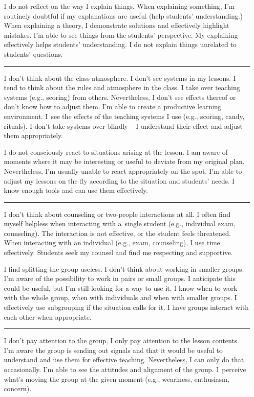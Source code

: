 \newpage
{}
{I do not reflect on the way I explain things.}
{When explaining something, I'm routinely doubtful if my explanations are useful (help students' understanding.)}
{When explaining a theory, I demonstrate solutions and effectively highlight mistakes. I'm able to see things from the students' perspective. My explaining effectively helps students' understanding. I do not explain things unrelated to students' questions.}

\rule{\textwidth}{0.4pt}
{I don't think about the class atmosphere. I don't see systems in my lessons.}
{I tend to think about the rules and atmosphere in the class. I take over teaching systems (e.g., scoring) from others. Nevertheless, I don't see effects thereof or don't know how to adjust them.}
{I'm able to create a productive learning environment. I~see the effects of the teaching systems I use (e.g., scoring, candy, rituals). I don't take systems over blindly -- I understand their effect and adjust them appropriately.}

\newpage
{}
{I do not consciously react to situations arising at the lesson.}
{I am aware of moments where it may be interesting or useful to deviate from my original plan. Nevertheless, I'm usually unable to react appropriately on the spot.}
{I'm able to adjust my lessons on the fly according to the situation and students' needs. I know enough tools and can use them effectively.}

\rule{\textwidth}{0.4pt}
{I don't think about counseling or two-people interactions at all.}
{I often find myself helpless when interacting with a~single student (e.g., individual exam, counseling). The interaction is not effective, or the student feels threatened.}
{When interacting with an individual (e.g., exam, counseling), I use time effectively. Students seek my counsel and find me respecting and supportive.}

\newpage
{}
{I find splitting the group useless. I don't think about working in smaller groups.}
{I'm aware of the possibility to work in pairs or small groups. I anticipate this could be useful, but I'm still looking for a way to use it.}
{I know when to work with the whole group, when with individuals and when with smaller groups. I effectively use subgrouping if the situation calls for it. I have groups interact with each other when appropriate.}

\rule{\textwidth}{0.4pt}
{I don't pay attention to the group, I only pay attention to the lesson contents.}
{I'm aware the group is sending out signals and that it would be useful to understand and use them for effective teaching. Nevertheless, I can only do that occasionally.}
{I'm able to see the attitudes and alignment of the group. I~perceive what's moving the group at the given moment (e.g., weariness, enthusiasm, concern).}
